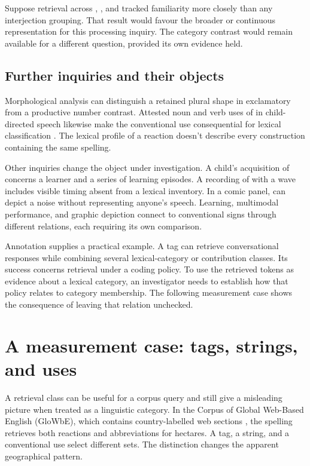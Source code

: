 \documentclass[12pt]{article}
\begin{document}
Suppose retrieval across , , and
 tracked familiarity more closely than any
interjection grouping. That result would favour the broader or continuous
representation for this processing inquiry. The
category contrast would remain available for a different question,
provided its own evidence held.

\subsection{Further inquiries and their objects}

Morphological analysis can distinguish a retained plural shape in
exclamatory  from a productive number contrast. Attested
noun and verb uses of  in child-directed speech likewise
make the conventional use consequential for lexical classification
\citep[36]{stange2016}. The lexical profile of a reaction doesn't describe
every construction containing the same spelling.

Other inquiries change the object under investigation. A child's acquisition
of  concerns a learner and a series of learning episodes.
A recording of  with a wave includes visible timing absent
from a lexical inventory. In a comic panel, 
can depict a noise without representing anyone's speech. Learning,
multimodal performance, and graphic depiction connect to conventional signs
through different relations, each requiring its own comparison.

Annotation supplies a practical example. A tag can retrieve conversational
responses while combining several lexical-category or contribution classes. Its
success concerns retrieval under a coding policy. To use the retrieved
tokens as evidence about a lexical category, an investigator needs
to establish how that policy relates to category membership. The
following measurement case shows the consequence of leaving that relation
unchecked.

\section{A measurement case: tags, strings, and uses}\label{sec:evidence}

A retrieval class can be useful for a corpus query and still give
a misleading picture when treated as a linguistic category. In the
Corpus of Global Web-Based English (GloWbE), which contains country-labelled
web sections \citep{daviesfuchs2015}, the spelling  retrieves
both reactions and abbreviations for hectares. A tag, a string, and
a conventional use select different sets. The distinction changes the
apparent geographical pattern.
\end{document}
